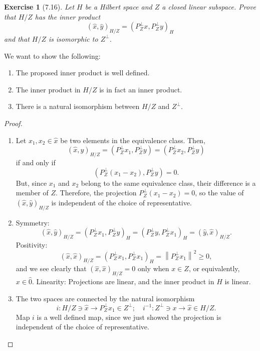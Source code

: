\documentclass[letterpaper,twoside,11pt]{article}
\theoremstyle{mystyle}
\newtheorem*{exercise}{Exercise}
\begin{document}
\begin{exercise}[7.16]
  Let $H$ be a Hilbert space and $Z$ a closed linear subspace. Prove that $H/Z$ has the inner product 
  \[\left( \hat x, \hat y \right)_{H/Z} = \left( P_Z^{\perp} x,P_Z^{\perp} y  \right)_H\]
  and that $H/Z$ is isomorphic to $Z^\perp$.
\end{exercise}

We want to show the following: 
\begin{enumerate}
  \item The proposed inner product is well defined. 
  \item The inner product in $H/Z$ is in fact an inner product. 
  \item There is a natural isomorphism between $H/Z$ and $Z^\perp$. 
\end{enumerate}
\begin{proof}
  \begin{enumerate}
    \item Let $x_1, x_2 \in \hat x$ be two elements in the equivalence class. Then, 
    \[{\left( {\hat x,\hat y} \right)_{H/Z}} = \left( {P_Z^ \bot {x_1},P_Z^ \bot y} \right) = \left( {P_Z^ \bot {x_2},P_Z^ \bot y} \right)\]
    if and only if 
    \[\left( {P_Z^ \bot \left( {{x_1} - {x_2}} \right),P_Z^ \bot y} \right) = 0.\]
    But, since $x_1$ and $x_2$ belong to the same equivalence class, their difference is a member of $Z$. Therefore, the projection ${P_Z^ \bot \left( {{x_1} - {x_2}} \right)}=0$, so the value of ${\left( {\hat x,\hat y} \right)_{H/Z}}$ is independent of the choice of representative. 

    \item Symmetry: 
    \[{\left( {\hat x,\hat y} \right)_{H/Z}} = {\left( {P_Z^ \bot {x_1},P_Z^ \bot y} \right)_H} = {\left( {P_Z^ \bot y,P_Z^ \bot {x_1}} \right)_H} = {\left( {\hat y,\hat x} \right)_{H/Z}}.\]
    Positivity: 
    \[{\left( {\hat x,\hat x} \right)_{H/Z}} = {\left( {P_Z^ \bot {x_1},P_Z^ \bot {x_1}} \right)_H} = {\left\| {P_Z^ \bot {x_1}} \right\|^2} \geqslant 0,\]
    and we see clearly that $(\hat x, \hat x)_{H/Z} = 0$ only when $x \in Z$, or equivalently, $x\in \hat 0$. 
    Linearity: Projections are linear, and the inner product in $H$ is linear. 

    \item The two spaces are connected by the natural isomorphism 
    \[i:H/Z \ni \hat x \to P_Z^ \bot {x_1} \in {Z^ \bot };\quad {i^{ - 1}}:{Z^ \bot } \ni x \to \hat x \in H/Z.\]
    Map $i$ is a well defined map, since we just showed the projection is independent of the choice of representative. 
  \end{enumerate}
\end{proof}
\end{document}
